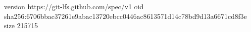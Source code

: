 version https://git-lfs.github.com/spec/v1
oid sha256:6706bbac37261e9abac13720ebcc0446ac8613571d14c78bd9d13a6671cd8f3e
size 215715
